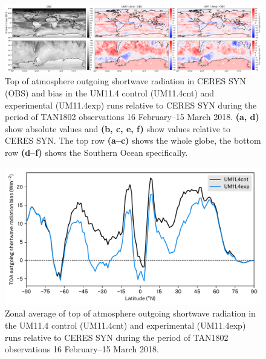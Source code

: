 \clearpage

\begin{figure}[t]
\centering
\includegraphics[width=\textwidth]{chapter4/fig/sw.png}
\caption[Top of atmosphere outgoing shortwave radiation]{Top of atmosphere outgoing shortwave radiation in CERES SYN (OBS) and
bias in the UM11.4 control (UM11.4cnt) and experimental (UM11.4exp) runs relative
to CERES SYN during the period of TAN1802 observations 16 February--15 March 2018.
\textbf{(a, d)} show absolute values and \textbf{(b, c, e, f)} show values relative
to CERES SYN. The top row \textbf{(a--c)} shows the whole globe, the bottom
row \textbf{(d--f)} shows the Southern Ocean specifically.
}
\label{fig:sw}
\end{figure}

\clearpage

\begin{figure}[t]
\centering
\includegraphics[width=\textwidth]{chapter4/fig/sw_zonal.pdf}
\caption[Zonal average of top of atmosphere outgoing shortwave radiation]{
Zonal average of top of atmosphere outgoing shortwave radiation in
the UM11.4 control (UM11.4cnt) and experimental (UM11.4exp) runs relative
to CERES SYN during the period of TAN1802 observations 16 February--15 March 2018. 
}
\label{fig:sw-zonal}
\end{figure}

\clearpage


